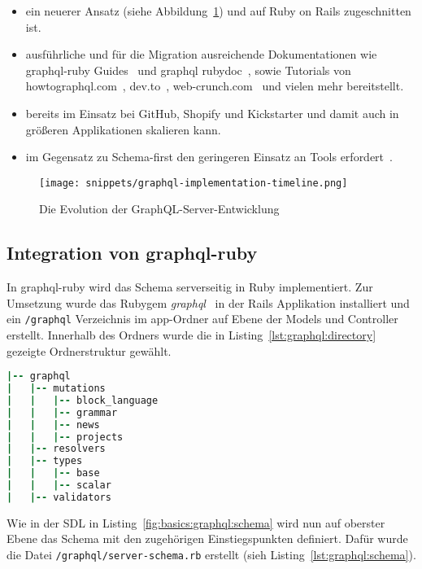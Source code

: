 \begin{description}
\begin{itemize}
	\setlength\itemsep{-1em}
	\item ein neuerer Ansatz (siehe Abbildung~\ref{graphql:evolution}) und auf Ruby on Rails zugeschnitten ist.
	\item ausführliche und für die Migration ausreichende Dokumentationen wie graphql-ruby Guides~\cite{graphql-ruby-guides} und graphql rubydoc~\cite{graphql-rubydoc}, sowie Tutorials von howtographql.com~\cite{howto-graphql-ruby}, dev.to~\cite{dev.to-graphql-ruby}, web-crunch.com~\cite{web-crunch-graphql-ruby} und vielen mehr bereitstellt.
	\item bereits im Einsatz bei GitHub, Shopify und Kickstarter und damit auch in größeren Applikationen skalieren kann.
	\item im Gegensatz zu Schema-first den geringeren Einsatz an Tools erfordert~\cite{schema-first-tooling}.

\end{itemize}
\end{description}

\begin{figure}[h!]
	\centering
	\texttt{[image: snippets/graphql-implementation-timeline.png]}
	\caption{Die Evolution der GraphQL-Server-Entwicklung ~\cite{graphql-evolution-graphic}}
	\label{graphql:evolution}
\end{figure}

\subsection{Integration von graphql-ruby}
In graphql-ruby wird das Schema serverseitig in Ruby implementiert.
Zur Umsetzung wurde das Rubygem \emph{graphql}~\cite{graphql-rubygem} in der Rails Applikation installiert und ein \lstinline|/graphql| Verzeichnis im app-Ordner auf Ebene der Models und Controller erstellt.
Innerhalb des Ordners wurde die in Listing~\ref{lst:graphql:directory} gezeigte Ordnerstruktur gewählt.

\begin{lstlisting}[language=Ruby,float=h!,caption={Ordnerstruktur}, label={lst:graphql:directory}]
|-- graphql
|   |-- mutations
|   |   |-- block_language
|   |   |-- grammar
|   |   |-- news
|   |   |-- projects
|   |-- resolvers
|   |-- types
|   |   |-- base
|   |   |-- scalar
|   |-- validators
\end{lstlisting}

Wie in der SDL in Listing~\ref{fig:basics:graphql:schema} wird nun auf oberster Ebene das Schema mit den zugehörigen Einstiegspunkten definiert. Dafür wurde die Datei \lstinline|/graphql/server-schema.rb| erstellt (sieh Listing~\ref{lst:graphql:schema}).


